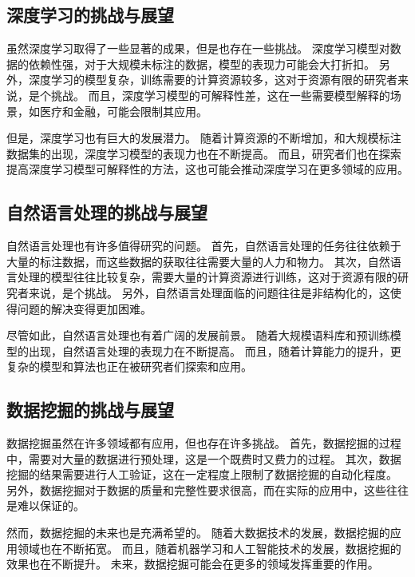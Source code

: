 \subsection{深度学习的挑战与展望}\label{subsec:deep-learning-future}
虽然深度学习取得了一些显著的成果，但是也存在一些挑战。
深度学习模型对数据的依赖性强，对于大规模未标注的数据，模型的表现力可能会大打折扣。
另外，深度学习的模型复杂，训练需要的计算资源较多，这对于资源有限的研究者来说，是个挑战。
而且，深度学习模型的可解释性差，这在一些需要模型解释的场景，如医疗和金融，可能会限制其应用。\par
但是，深度学习也有巨大的发展潜力。
随着计算资源的不断增加，和大规模标注数据集的出现，深度学习模型的表现力也在不断提高。
而且，研究者们也在探索提高深度学习模型可解释性的方法，这也可能会推动深度学习在更多领域的应用。\par

\subsection{自然语言处理的挑战与展望}\label{subsec:nlp-future}
自然语言处理也有许多值得研究的问题。
首先，自然语言处理的任务往往依赖于大量的标注数据，而这些数据的获取往往需要大量的人力和物力。
其次，自然语言处理的模型往往比较复杂，需要大量的计算资源进行训练，这对于资源有限的研究者来说，是个挑战。
另外，自然语言处理面临的问题往往是非结构化的，这使得问题的解决变得更加困难。\par
尽管如此，自然语言处理也有着广阔的发展前景。
随着大规模语料库和预训练模型的出现，自然语言处理的表现力在不断提高。
而且，随着计算能力的提升，更复杂的模型和算法也正在被研究者们探索和应用。\par

\subsection{数据挖掘的挑战与展望}\label{subsec:data-mining-future}
数据挖掘虽然在许多领域都有应用，但也存在许多挑战。
首先，数据挖掘的过程中，需要对大量的数据进行预处理，这是一个既费时又费力的过程。
其次，数据挖掘的结果需要进行人工验证，这在一定程度上限制了数据挖掘的自动化程度。
另外，数据挖掘对于数据的质量和完整性要求很高，而在实际的应用中，这些往往是难以保证的。\par
然而，数据挖掘的未来也是充满希望的。
随着大数据技术的发展，数据挖掘的应用领域也在不断拓宽。
而且，随着机器学习和人工智能技术的发展，数据挖掘的效果也在不断提升。
未来，数据挖掘可能会在更多的领域发挥重要的作用。\par
